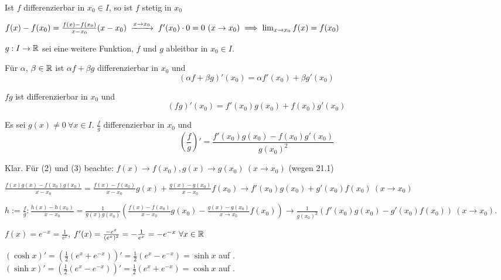 \documentclass[a4paper,oneside,DIV15,BCOR12mm]{scrbook}
\begin{document}
\begin{satz}
Ist $f$ differenzierbar in $x_0\in I$, so ist $f$ stetig in $x_0$
\end{satz}

\begin{beweis}
$f(x)-f(x_0) = \frac{f(x)-f(x_0)}{x-x_0}(x-x_0) \towegen{x\to x_0} f'(x_0)\cdot 0 = 0 \ (x\to x_0) \folgt \lim_{x\to x_0}f(x) = f(x_0)$
\end{beweis}

\begin{satz}[Ableitungsregeln]
$g:I\to\mathbb{R}$ sei eine weitere Funktion, $f$ und $g$ ableitbar in $x_0 \in I$.
\begin{liste}
\item Für $\alpha$, $\beta \in \mathbb{R}$ ist $\alpha f + \beta g$ differenzierbar in $x_0$ und $$(\alpha f+ \beta g)'(x_0) = \alpha f'(x_0) + \beta g'(x_0)$$
\item $fg$ ist differenzierbar in $x_0$ und $$(fg)'(x_0) = f'(x_0)g(x_0)+f(x_0)g'(x_0)$$
\item Es sei $g(x) \ne 0 \ \forall x\in I$. $\frac{f}{g}$ differenzierbar in $x_0$ und $$(\frac{f}{g})'=\frac{f'(x_0)g(x_0) - f(x_0)g'(x_0)}{g(x_0)^2}$$
\end{liste}
\end{satz}

\begin{beweis}
\begin{liste}
\item Klar. Für (2) und (3) beachte: $f(x)\to f(x_0), g(x)\to g(x_0)\ (x\to x_0)$ (wegen 21.1)
\item $\frac{f(x)g(x)-f(x_0)g(x_0)}{x-x_0} = \frac{f(x) -f(x_0)}{x-x_0}g(x) + \frac{g(x)-g(x_0)}{x-x_0}f(x_0) \to f'(x_0)g(x_0) + g'(x_0)f(x_0) \ (x\to x_0)$
\item $h:=\frac{f}{g}: \frac{h(x)-h(x_0)}{x-x_0}=\frac{1}{g(x)g(x_0)}\left(\frac{f(x)-f(x_0)}{x-x_0}g(x_0) - \frac{g(x)-g(x_0)}{x\to x_0}f(x_0)\right) \to \frac{1}{g(x_0)^2}(f'(x_0)g(x_0) - g'(x_0)f(x_0)) \ (x\to x_0)$.
\end{liste}
\end{beweis}

\begin{beispiele}
\item $f(x) = e^{-x} = \frac{1}{e^x}$, $f'(x) = \frac{-e^x}{(e^x)^2} = -\frac{1}{e^x} = -e^{-x} \ \forall x\in\mathbb{R}$
\item $(\cosh x)' = (\frac{1}{2}(e^x+e^{-x}))' = \frac{1}{2}(e^x-e^{-x}) = \sinh x$ auf \MdR.\\
 $(\sinh x)' = (\frac{1}{2}(e^x-e^{-x}))' = \frac{1}{2}(e^x+e^{-x}) = \cosh x$ auf \MdR.
\end{beispiele}
\end{document}
